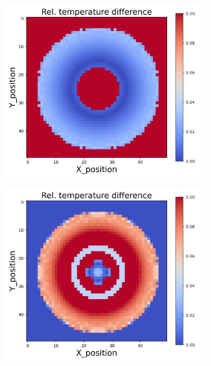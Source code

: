 {\begin{figure}[h]
\begin{minipage}{\textwidth}
\begin{subfigure}{0.28\textwidth}
        \end{subfigure}
        \begin{subfigure}{0.28\textwidth}
            \centering
            \includegraphics[width=\textwidth]{figures/raw_data/26/linear/T_bias.jpg}
        \end{subfigure}
        \begin{subfigure}{0.28\textwidth}
            \centering
            \includegraphics[width=\textwidth]{figures/raw_data/31/linear/T_bias.jpg}

\end{subfigure}
\end{minipage}
\end{figure}}
